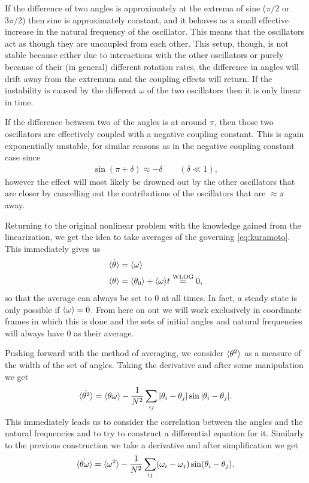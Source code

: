 \documentclass[10pt,a4paper,twocolumn]{article}
\begin{document}
If the difference of two angles is approximately at the extrema of sine ($\pi/2$ or $3\pi/2$) then sine is approximately constant, and it behaves as a small effective increase in the natural frequency of the oscillator. This means that the oscillators act as though they are uncoupled from each other. This setup, though, is not stable because either due to interactions with the other oscillators or purely because of their (in general) different rotation rates, the difference in angles will drift away from the extremum and the coupling effects will return. If the instability is caused by the different $\omega$ of the two oscillators then it is only linear in time.

If the difference between two of the angles is at around $\pi$, then those two oscillators are effectively coupled with a negative coupling constant. This is again exponentially unstable, for similar reasons as in the negative coupling constant case since
%
\begin{align}
    \sin(\pi + \delta) \approx -\delta \quad \quad (\delta \ll 1),
\end{align}
%
however the effect will most likely be drowned out by the other oscillators that are closer by cancelling out the contributions of the oscillators that are $\approx \pi$ away.

Returning to the original nonlinear problem with the knowledge gained from the linearization, we get the idea to take averages of the governing \cref{eq:kuramoto}. This immediately gives us
%
\begin{align}
    \dot{\braket{\theta}} &= \braket{\omega}\notag\\
    \braket{\theta} &= \braket{\theta_0} + \braket{\omega} \! t \stackrel{\text{WLOG}}{=} 0,
\end{align}
%
so that the average can always be set to $0$ at all times. In fact, a steady state is only possible if $\braket{\omega} = 0$. From here on out we will work exclusively in coordinate frames in which this is done and the sets of initial angles and natural frequencies will always have $0$ as their average.

Pushing forward with the method of averaging, we consider $\braket{\theta^2}$ as a measure of the width of the set of angles. Taking the derivative and after some manipulation we get
%
\begin{align}\label{eq:theta_theta}
    \dot{\braket{\theta^2}} = \braket{\theta \omega} - \frac{1}{N^2}\sum_{ij} |\theta_i - \theta_j| \sin |\theta_i - \theta_j|.
\end{align}
%
This immediately leads us to consider the correlation between the angles and the natural frequencies and to try to construct a differential equation for it. Similarly to the previous construction we take a derivative and after simplification we get
%
\begin{align}\label{eq:theta_omega}
    \dot{\braket{\theta \omega}} = \braket{\omega^2} - \frac{1}{N^2} \sum_{ij} (\omega_i - \omega_j) \sin (\theta_i - \theta_j).
\end{align}
\end{document}
